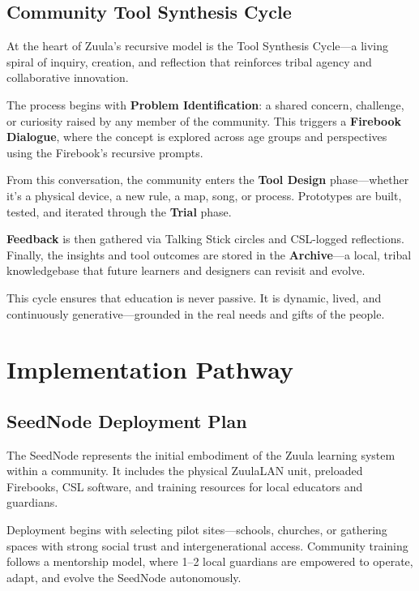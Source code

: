 \documentclass[12pt]{article}
\begin{document}
\subsection*{Community Tool Synthesis Cycle}

At the heart of Zuula's recursive model is the Tool Synthesis Cycle—a living spiral of inquiry, creation, and reflection that reinforces tribal agency and collaborative innovation.

The process begins with \textbf{Problem Identification}: a shared concern, challenge, or curiosity raised by any member of the community. This triggers a \textbf{Firebook Dialogue}, where the concept is explored across age groups and perspectives using the Firebook's recursive prompts.

From this conversation, the community enters the \textbf{Tool Design} phase—whether it's a physical device, a new rule, a map, song, or process. Prototypes are built, tested, and iterated through the \textbf{Trial} phase.

\textbf{Feedback} is then gathered via Talking Stick circles and CSL-logged reflections. Finally, the insights and tool outcomes are stored in the \textbf{Archive}—a local, tribal knowledgebase that future learners and designers can revisit and evolve.

This cycle ensures that education is never passive. It is dynamic, lived, and continuously generative—grounded in the real needs and gifts of the people.

\section*{Implementation Pathway}

\subsection*{SeedNode Deployment Plan}

The SeedNode represents the initial embodiment of the Zuula learning system within a community. It includes the physical ZuulaLAN unit, preloaded Firebooks, CSL software, and training resources for local educators and guardians.

Deployment begins with selecting pilot sites—schools, churches, or gathering spaces with strong social trust and intergenerational access. Community training follows a mentorship model, where 1–2 local guardians are empowered to operate, adapt, and evolve the SeedNode autonomously.
\end{document}
